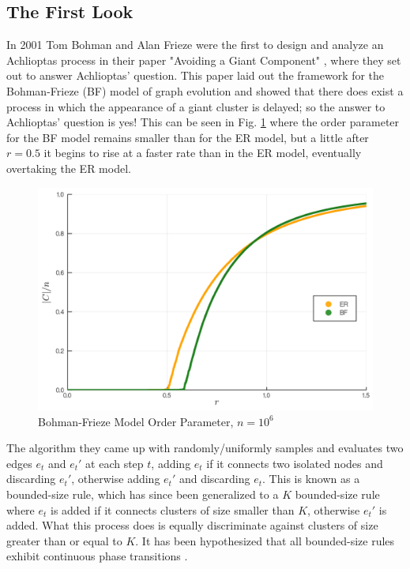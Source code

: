 \subsection{The First Look}
In 2001 Tom Bohman and Alan Frieze were the first to design and analyze an Achlioptas process in their paper "Avoiding a Giant Component" \cite{BF}, where they set out to answer Achlioptas' question.
This paper laid out the framework for the Bohman-Frieze (BF) model of graph evolution and showed that there does exist a process in which the appearance of a giant cluster is delayed; so the answer to Achlioptas' question is yes!
This can be seen in Fig. \ref{fig:ER_BF_transition} where the order parameter for the BF model remains smaller than for the ER model, but a little after $r = 0.5$ it begins to rise at a faster rate than in the ER model, eventually overtaking the ER model.

\begin{figure}[H]
	\centering
	\includegraphics[width=350pt]{images/Network_ER_BF_1e6_order_param.png}
	\caption{Bohman-Frieze Model Order Parameter, $n = 10^6$}
	\label{fig:ER_BF_transition}
\end{figure}

The algorithm they came up with randomly/uniformly samples and evaluates two edges $e_t$ and $e_t'$ at each step $t$, adding $e_t$ if it connects two isolated nodes and discarding $e_t'$, otherwise adding $e_t'$ and discarding $e_t$.
This is known as a bounded-size rule, which has since been generalized to a $K$ bounded-size rule where $e_t$ is added if it connects clusters of size smaller than $K$, otherwise $e_t'$ is added.
What this process does is equally discriminate against clusters of size greater than or equal to $K$.
It has been hypothesized that all bounded-size rules exhibit continuous phase transitions \cite{Spencer_Wormald}.

